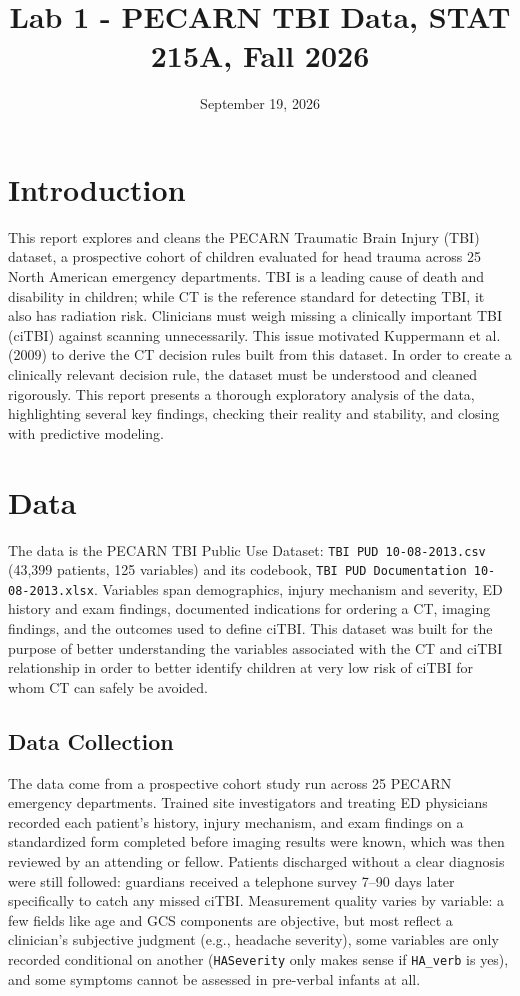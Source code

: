 \documentclass[10pt,letterpaper]{article}
\title{Lab 1 - PECARN TBI Data, STAT 215A, Fall 2026}
\author{}
\date{September 19, 2026}
\begin{document}
\maketitle

\section{Introduction}\label{introduction}

This report explores and cleans the PECARN Traumatic Brain Injury (TBI) dataset, a
prospective cohort of children evaluated for head trauma across 25 North American emergency
departments. TBI is a leading cause of death and disability in children; while CT is the
reference standard for detecting TBI, it also has radiation risk. Clinicians must
weigh missing a clinically important TBI (ciTBI) against scanning unnecessarily. This issue motivated Kuppermann
et al. (2009) to derive the CT decision rules built from this dataset. In order to create a clinically relevant decision rule, the dataset must be understood and cleaned rigorously. This report presents a thorough exploratory analysis of the data, highlighting several key findings, checking their reality and stability, and closing with predictive modeling.

\section{Data}\label{data}

The data is the PECARN TBI Public Use Dataset: \texttt{TBI PUD 10-08-2013.csv} (43,399 patients,
125 variables) and its codebook, \texttt{TBI PUD Documentation 10-08-2013.xlsx}. Variables span
demographics, injury mechanism and severity, ED history and exam findings, documented
indications for ordering a CT, imaging findings, and the outcomes used to define ciTBI. This dataset was built for the purpose of better understanding the variables associated with the CT and ciTBI relationship in order to better identify children at very low risk of ciTBI for whom CT can safely be avoided.

\subsection{Data Collection}\label{data-collection}

The data come from a prospective cohort study run across 25 PECARN emergency departments. Trained
site investigators and treating ED physicians recorded each patient's history, injury mechanism,
and exam findings on a standardized form completed before imaging results were known, which was
then reviewed by an attending or fellow. Patients discharged without a clear diagnosis were still
followed: guardians received a telephone survey 7--90 days later specifically to catch any missed
ciTBI. Measurement quality varies by variable: a few fields like age and GCS components are
objective, but most reflect a clinician's subjective judgment (e.g., headache severity), some
variables are only recorded conditional on another (\texttt{HASeverity} only makes sense if
\texttt{HA\_verb} is yes), and some symptoms cannot be assessed in pre-verbal infants at all.
\end{document}
